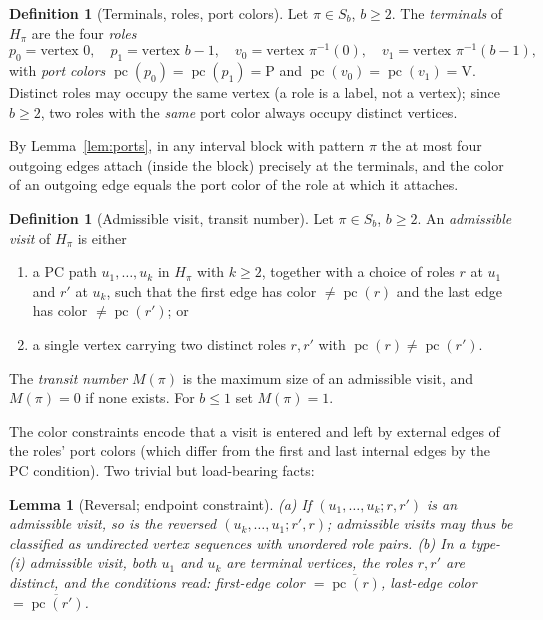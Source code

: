 \documentclass[11pt]{article}
\newtheorem{lemma}[theorem]{Lemma}
\theoremstyle{definition}
\newtheorem{definition}[theorem]{Definition}
\newcommand{\inv}[1]{#1^{-1}}
\DeclareMathOperator{\pc}{pc}
\begin{document}
\begin{definition}[Terminals, roles, port colors]\label{def:terminals}
Let $\pi \in S_b$, $b \ge 2$. The \emph{terminals} of $H_\pi$ are the four
\emph{roles}
\[
p_0 = \text{vertex } 0, \quad
p_1 = \text{vertex } b-1, \quad
v_0 = \text{vertex } \inv\pi(0), \quad
v_1 = \text{vertex } \inv\pi(b-1),
\]
with \emph{port colors} $\pc(p_0) = \pc(p_1) = \mathrm P$ and
$\pc(v_0) = \pc(v_1) = \mathrm V$. Distinct roles may occupy the same vertex (a role is
a label, not a vertex); since $b \ge 2$, two roles with the \emph{same} port color
always occupy distinct vertices.
\end{definition}

By Lemma~\ref{lem:ports}, in any interval block with pattern $\pi$ the at most four
outgoing edges attach (inside the block) precisely at the terminals, and the color of
an outgoing edge equals the port color of the role at which it attaches.

\begin{definition}[Admissible visit, transit number]\label{def:M}
Let $\pi \in S_b$, $b \ge 2$. An \emph{admissible visit} of $H_\pi$ is either
\begin{enumerate}
\item[(i)] a PC path $u_1, \dots, u_k$ in $H_\pi$ with $k \ge 2$, together with a
choice of roles $r$ at $u_1$ and $r'$ at $u_k$, such that the first edge has color
$\ne \pc(r)$ and the last edge has color $\ne \pc(r')$; or
\item[(ii)] a single vertex carrying two distinct roles $r, r'$ with
$\pc(r) \ne \pc(r')$.
\end{enumerate}
The \emph{transit number} $M(\pi)$ is the maximum size of an admissible visit, and
$M(\pi) = 0$ if none exists. For $b \le 1$ set $M(\pi) = 1$.
\end{definition}

The color constraints encode that a visit is entered and left by external edges of the
roles' port colors (which differ from the first and last internal edges by the PC
condition). Two trivial but load-bearing facts:

\begin{lemma}[Reversal; endpoint constraint]\label{lem:reversal}
\emph{(a)} If $(u_1, \dots, u_k; r, r')$ is an admissible visit, so is the reversed
$(u_k, \dots, u_1; r', r)$; admissible visits may thus be classified as undirected
vertex sequences with unordered role pairs.
\emph{(b)} In a type-(i) admissible visit, both $u_1$ and $u_k$ are terminal vertices,
the roles $r, r'$ are distinct, and the conditions read: first-edge color
$= \overline{\pc(r)}$, last-edge color $= \overline{\pc(r')}$.
\end{lemma}
\end{document}
